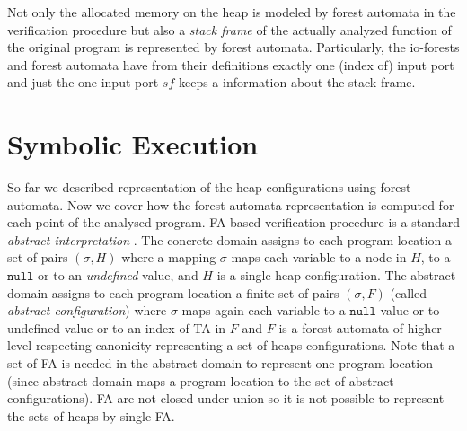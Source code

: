 Not only the allocated memory on the heap is modeled by forest automata
in the verification procedure but also a \emph{stack frame} of the actually
analyzed function of the original program is represented by forest automata.
Particularly, the io-forests and forest automata have from their definitions exactly one (index of) input port and
just the one input port $sf$ keeps a information about the stack frame.

\section{Symbolic Execution}
\label{sec:se}

So far we described representation of the heap configurations using forest automata.
Now we cover how the forest automata representation is computed for each point of the analysed program.
FA-based verification procedure is a standard \emph{abstract interpretation} \cite{cousot:77}.
The concrete domain assigns to each program location a set of pairs
$(\sigma,H)$ where a mapping $\sigma$ maps each variable
to a node in $H$, to a $\texttt{null}$ or to an \emph{undefined} value, and $H$ is a single heap configuration.
The abstract domain assigns to each program location a finite set of pairs
$(\sigma, F)$ (called \emph{abstract configuration}) where $\sigma$ maps again each variable to a
$\texttt{null}$ value or to undefined value or to an index of TA in $F$ and $F$ is a forest automata
of higher level respecting canonicity representing a set of heaps configurations.
Note that a set of FA is needed in the abstract domain to represent
one program location (since abstract domain maps a program location
to the set of abstract configurations).
FA are not closed under union so it is not possible to represent the sets of heaps by single FA.

